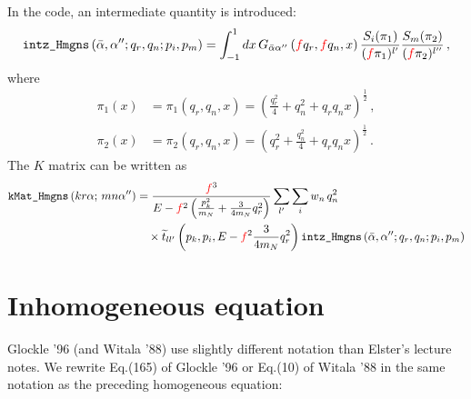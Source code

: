 \documentclass[11pt,aps]{revtex4}
\newcommand{\PF}{{\color{red}f}}
\begin{document}
In the code, an intermediate quantity is introduced:
\begin{equation}
  \texttt{intz\_Hmgns}\left(\bar{\alpha}, \alpha''; q_r, q_n; p_i, p_m\right) = \int_{-1}^1{dx}\, G_{\bar{\alpha}\alpha''}\left(\PF q_r, \PF q_n, x\right) \frac{S_i(\pi_1)}{(\PF \pi_1)^{l'}}
  \frac{S_m(\pi_2)}{(\PF \pi_2)^{l''}} \, ,
\end{equation}
where
\begin{equation}
\begin{split}
  \pi_1(x) &= \pi_1(q_r, q_n, x) = \left(\frac{q_r^2}{4} + q_n^2 + q_r q_n x \right)^{\frac{1}{2}}\, , \\
  \pi_2(x) &= \pi_2(q_r, q_n, x) = \left(q_r^2 + \frac{q_n^2}{4} + q_r q_n x \right)^{\frac{1}{2}} \, . \label{eqn_pi1pi2}
\end{split}
\end{equation}
The $K$ matrix can be written as
\begin{equation}
\begin{split}
  \texttt{kMat\_Hmgns}\left(kr\alpha;\, mn\alpha''\right) &= \frac{\PF^3}{E - \PF^2 \left(\frac{p_{k}^2}{m_N} + \frac{3}{4m_N}q_r^2 \right)} \sum_{l'} \sum_{i} w_n\, q_n^2 \\
  & \quad  \times \widetilde{t}_{ll'}\left(p_k, p_i, E - \PF^2 \frac{3}{4m_N}q_r^2\right) \texttt{intz\_Hmgns}\left(\bar{\alpha}, \alpha''; q_r, q_n; p_i, p_m\right)
\end{split}
\end{equation}


\section{Inhomogeneous equation}

Glockle '96 (and Witala '88) use slightly different notation than Elster's lecture notes. We rewrite Eq.(165) of Glockle '96 or Eq.(10) of Witala '88 in the same notation as the preceding homogeneous equation:
\end{document}
